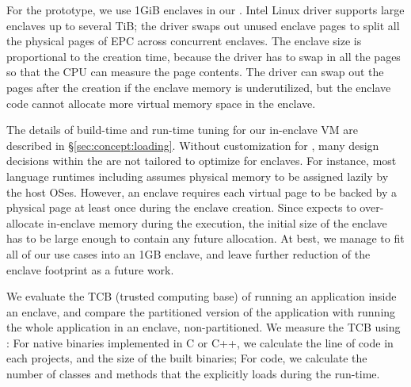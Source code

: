 For the prototype, we use 1GiB enclaves in our \dynamicframework{}.
Intel{} \sgx{} Linux driver supports large
enclaves up to several TiB;
the driver swaps out unused enclave pages
to split all the physical pages of EPC across concurrent enclaves.  
The enclave size is proportional to the creation time,
because the driver has to swap in all the pages so that the CPU can measure the page contents.
The driver can swap out the pages after the creation if the enclave memory is underutilized, but the enclave code cannot allocate more virtual memory space in the enclave.


The details of build-time and run-time tuning for our in-enclave VM are described in \S\ref{sec:concept:loading}.
Without customization for \sgx{},
many design decisions within the \jvmname{} \jvm{} are not tailored to optimize for enclaves.
For instance, most language runtimes including \jvmname{} assumes physical memory
to be assigned lazily by the host OSes.
However, an \sgx{} enclave requires each virtual page to be backed by a physical page at least once during the enclave creation.  
Since \jvmname{} expects to over-allocate in-enclave
memory during the execution,
the initial size of the enclave has to be large enough to contain any future allocation.
At best, we manage to fit all of our use cases into an 1GB enclave,
and leave further reduction of the enclave footprint as a future work.





We evaluate the TCB (trusted computing base) of running an \java{} application
inside an enclave,
and compare the partitioned version of the application
with running the whole application in an enclave, non-partitioned.
We measure the TCB using \emph{\tcbsize}:
For native binaries implemented in C or C++, we calculate the line of code in each projects, and the size of the built binaries;
For \java{} code, we calculate the number of classes and methods that the \jvm{} explicitly loads during the run-time.


